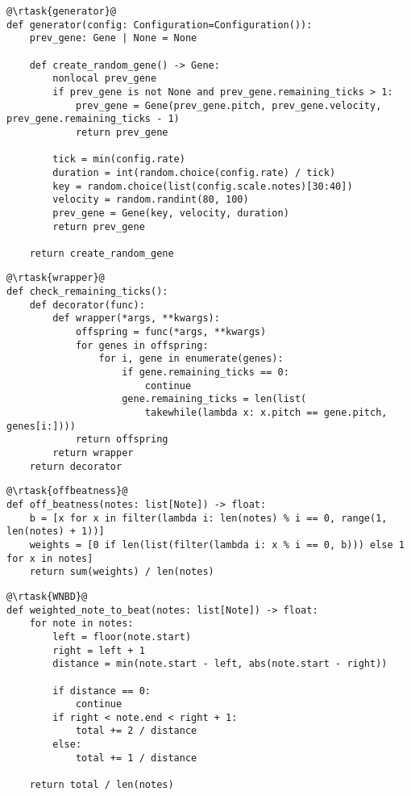 \begin{verbatim}
@\rtask{generator}@
def generator(config: Configuration=Configuration()):
    prev_gene: Gene | None = None

    def create_random_gene() -> Gene:
        nonlocal prev_gene
        if prev_gene is not None and prev_gene.remaining_ticks > 1:
            prev_gene = Gene(prev_gene.pitch, prev_gene.velocity, prev_gene.remaining_ticks - 1)
            return prev_gene

        tick = min(config.rate)
        duration = int(random.choice(config.rate) / tick)
        key = random.choice(list(config.scale.notes)[30:40])
        velocity = random.randint(80, 100)
        prev_gene = Gene(key, velocity, duration)
        return prev_gene

    return create_random_gene
\end{verbatim}

\begin{verbatim}
@\rtask{wrapper}@
def check_remaining_ticks():
    def decorator(func):
        def wrapper(*args, **kwargs):
            offspring = func(*args, **kwargs)
            for genes in offspring:
                for i, gene in enumerate(genes):
                    if gene.remaining_ticks == 0:
                        continue
                    gene.remaining_ticks = len(list(
                        takewhile(lambda x: x.pitch == gene.pitch, genes[i:])))
            return offspring
        return wrapper
    return decorator
\end{verbatim}

\begin{verbatim}
@\rtask{offbeatness}@
def off_beatness(notes: list[Note]) -> float:
    b = [x for x in filter(lambda i: len(notes) % i == 0, range(1, len(notes) + 1))]
    weights = [0 if len(list(filter(lambda i: x % i == 0, b))) else 1 for x in notes]
    return sum(weights) / len(notes)
\end{verbatim}

\begin{verbatim}
@\rtask{WNBD}@
def weighted_note_to_beat(notes: list[Note]) -> float:
    for note in notes:
        left = floor(note.start)
        right = left + 1
        distance = min(note.start - left, abs(note.start - right))

        if distance == 0:
            continue
        if right < note.end < right + 1:
            total += 2 / distance
        else:
            total += 1 / distance

    return total / len(notes)
\end{verbatim}

